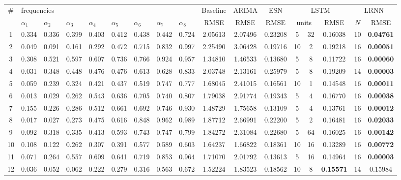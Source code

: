 \documentclass[twoside,11pt]{article}
\theoremstyle{definition}
\begin{document}
\begin{table}
  \centering\small
  \begin{tabular}{c*{8}{p{8mm}}cccc@{\,+\,}cccc}
     \toprule
	\# & \multicolumn{8}{l}{frequencies} & Baseline & ARIMA & ESN & \multicolumn{3}{c}{LSTM} & \multicolumn{2}{c}{LRNN}\\
	& $\alpha_1$ & $\alpha_2$ & $\alpha_3$ & $\alpha_4$ & $\alpha_5$ & $\alpha_6$ & $\alpha_7$ & $\alpha_8$ & RMSE & RMSE & RMSE & \multicolumn{2}{c}{units} & RMSE & $N$ & RMSE\\ \midrule
	1 & 0.334 & 0.336 & 0.399 & 0.403 & 0.412 & 0.438 & 0.442 & 0.724 & 2.05613 & 2.07496 & 0.23208 & 5 & 32 & 0.16038 & 10 & \textbf{0.04761}\\
	2 & 0.049 & 0.091 & 0.161 & 0.292 & 0.472 & 0.715 & 0.832 & 0.997 & 2.25490 & 3.06428 & 0.19716 & 10 & 2 & 0.19218 & 16 & \textbf{0.00051}\\
	3 & 0.308 & 0.521 & 0.597 & 0.607 & 0.736 & 0.766 & 0.924 & 0.957 & 1.34810 & 1.46533 & 0.13680 & 5 & 8 & 0.11722 & 16 & \textbf{0.00060}\\
	4 & 0.031 & 0.348 & 0.448 & 0.476 & 0.476 & 0.613 & 0.628 & 0.833 & 2.03748 & 2.13161 & 0.25979 & 5 & 8 & 0.19209 & 14 & \textbf{0.00003}\\
	5 & 0.059 & 0.239 & 0.324 & 0.421 & 0.437 & 0.519 & 0.747 & 0.777 & 1.68045 & 2.41015 & 0.16561 & 10 & 1 & 0.14548 & 16 & \textbf{0.00011}\\
	6 & 0.013 & 0.029 & 0.262 & 0.543 & 0.636 & 0.705 & 0.740 & 0.807 & 1.79038 & 2.91774 & 0.19343 & 5 & 4 & 0.16770 & 16 & \textbf{0.00038}\\
	7 & 0.155 & 0.226 & 0.286 & 0.512 & 0.661 & 0.692 & 0.746 & 0.930 & 1.48729 & 1.75658 & 0.13109 & 5 & 4 & 0.13761 & 16 & \textbf{0.00012}\\
	8 & 0.017 & 0.027 & 0.273 & 0.475 & 0.616 & 0.848 & 0.962 & 0.989 & 1.87712 & 2.66991 & 0.22200 & 5 & 2 & 0.16481 & 16 & \textbf{0.02033}\\
	9 & 0.092 & 0.318 & 0.335 & 0.413 & 0.593 & 0.743 & 0.747 & 0.799 & 1.84272 & 2.31084 & 0.22680 & 5 & 64 & 0.16025 & 16 & \textbf{0.00142}\\
	10 & 0.108 & 0.122 & 0.262 & 0.307 & 0.391 & 0.577 & 0.589 & 0.603 & 1.64237 & 1.66822 & 0.18361 & 10 & 16 & 0.13289 & 16 & \textbf{0.00772}\\
	11 & 0.071 & 0.264 & 0.557 & 0.609 & 0.641 & 0.719 & 0.853 & 0.964 & 1.71070 & 2.01792 & 0.13613 & 5 & 16 & 0.14964 & 16 & \textbf{0.00003}\\
	12 & 0.036 & 0.052 & 0.062 & 0.222 & 0.279 & 0.316 & 0.563 & 0.672 & 1.52224 & 1.83523 & 0.18562 & 10 & 8 & \textbf{0.15571} & 14 & 0.15984\\

\end{tabular}
\end{table}
\end{document}
